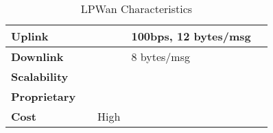 \begin{table}[h!]
\begin{tabulary}{\textwidth}{L|L|L|L|L}
	\bf{Uplink}                            &                           &                                 & 100bps, 12 bytes/msg                  & \\\hline
	\bf{Downlink}                          &                           &                                 & 8 bytes/msg                           & \\\hline
	\bf{Scalability}                       &                           &                                 &                                       & \\\hline
	\bf{Proprietary}                       &                           &                                 & \ok                                   & \\\hline
	\bf{Cost}                              &                           & High                            &                                       & \\\hline
	\end{tabulary}
	\caption{\label{tab:LPWan_characteristics} LPWan Characteristics \cite{al-kashoash_comparison_2016}}
\end{table}

